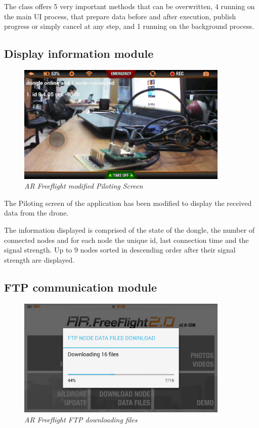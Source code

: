 The class offers 5 very important methods that can be overwritten, 4 running on the main UI process, that prepare data before and after execution, publish progress or simply cancel at any step, and 1 running on the background process.

\subsection{Display information module}

\begin{figure}[ht]
\begin{center}
\includegraphics[width=0.9\textwidth]{img/android_info.png}
\end{center}
\caption{\small \itshape{AR Freeflight modified Piloting Screen}}
\end{figure}

The Piloting screen of the application has been modified to display the received data from the drone.

The information displayed is comprised of the state of the dongle, the number of connected nodes and for each node the unique id, last connection time and the signal strength. Up to 9 nodes sorted in descending order after their signal strength are displayed.

\subsection{FTP communication module}

\begin{figure}[ht]
\begin{center}
\includegraphics[width=0.9\textwidth]{img/android_ftp.png}
\end{center}
\caption{\small \itshape{AR Freeflight FTP downloading files}}
\end{figure}

